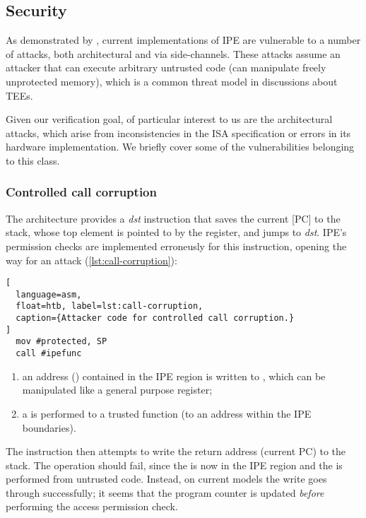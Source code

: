 \subsection{Security}
\label{sec:ipe-attacks}

As demonstrated by \cite{Bognar2024}, current implementations of IPE are vulnerable to a number of attacks, both architectural and via side-channels. These attacks assume an attacker that can execute arbitrary untrusted code (\ie can manipulate freely unprotected memory), which is a common threat model in discussions about TEEs.

Given our verification goal, of particular interest to us are the architectural attacks, which arise from inconsistencies in the ISA specification or errors in its hardware implementation. We briefly cover some of the vulnerabilities belonging to this class.

\subsubsection{Controlled call corruption}
\label{sec:call-corruption}

The \msp architecture provides a  \emph{dst} instruction that saves the current [PC] to the stack, whose top element is pointed to by the  register, and jumps to \emph{dst}. IPE's permission checks are implemented erroneusly for this instruction, opening the way for an attack (\cref{lst:call-corruption}):

\begin{lstlisting}[
  language=asm,
  float=htb, label=lst:call-corruption,
  caption={Attacker code for controlled call corruption.}
]
  mov #protected, SP
  call #ipefunc
\end{lstlisting}

\begin{enumerate}
\item an address () contained in the IPE region is written to , which can be manipulated like a general purpose register;
\item a  is performed to a trusted function (\ie to an address  within the IPE boundaries).
\end{enumerate}

The  instruction then attempts to write the return address (current PC) to the stack. The operation should fail, since the  is now in the IPE region and the  is performed from untrusted code. Instead, on current models the write goes through successfully; it seems that the program counter is updated \emph{before} performing the access permission check.


